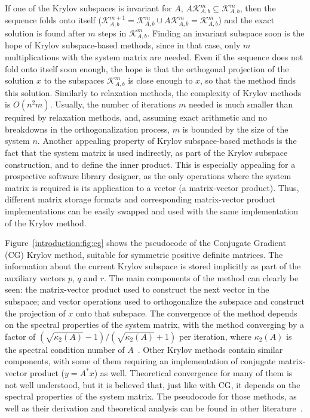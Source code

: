If one of the Krylov subspaces is invariant for $A$, \ie $A \mathcal{K}_{A,
b}^m \subseteq \mathcal{K}_{A, b}^m$, then the sequence folds onto itself
($\mathcal{K}_{A, b}^{m + 1} = \mathcal{K}_{A, b}^m \cup A \mathcal{K}_{A, b}^m
= \mathcal{K}_{A, b}^m$) and the exact solution is found after $m$ steps in
$\mathcal{K}_{A, b}^m$. Finding an invariant subspace soon is the hope of Krylov
subspace-based methods, since in that case, only $m$ multiplications with the
system matrix are needed. Even if the sequence does not fold onto itself soon
enough, the hope is that the orthogonal projection of the solution $x$ to the
subspaces $\mathcal{K}_{A, b}^m$ is close enough to $x$, so that the method
finds this solution. Similarly to relaxation methods, the complexity of Krylov
methods is $O(n^2 m)$. Usually, the number of iterations $m$ needed is much
smaller than required by relaxation methods, and, assuming exact arithmetic and
no breakdowns in the orthogonalization process, $m$ is bounded by the size of
the system $n$.  Another appealing property of Krylov subspace-based methods is
the fact that the system matrix is used indirectly, as part of the Krylov
subspace construction, and to define the inner product. This is especially
appealing for a prospective software library designer, as the only operations
where the system matrix is required is its application to a vector (\ie a
matrix-vector product).  Thus, different matrix storage formats and
corresponding matrix-vector product implementations can be easily swapped and
used with the same implementation of the Krylov method.

Figure~\ref{introduction:fig:cg} shows the pseudocode of the Conjugate Gradient
(CG) Krylov method, suitable for symmetric positive definite matrices. The
information about the current Krylov subspace is stored implicitly as part of
the auxiliary vectors $p$, $q$ and $r$. The main components of the method can
clearly be seen: the matrix-vector product used to construct the next vector in
the subspace; and vector operations used to orthogonalize the subspace and
construct the projection of $x$ onto that subspace. The convergence of the
method depends on the spectral properties of the system matrix, with the method
converging by a factor of $(\sqrt{\kappa_2(A)} - 1)/(\sqrt{\kappa_2(A)} + 1)$
per iteration, where $\kappa_2(A)$ is the spectral condition number of
$A$~\cite{barrettemplates,demmel,saad}. Other Krylov methods contain similar
components, with some of them requiring an implementation of conjugate
matrix-vector product ($y = A^*x$) as well. Theoretical convergence for many of
them is not well understood, but it is believed that, just like with CG, it
depends on the spectral properties of the system matrix. The pseudocode for
those methods, as well as their derivation and theoretical analysis can be found
in other literature~\cite{barrettemplates,demmel,saad}.

